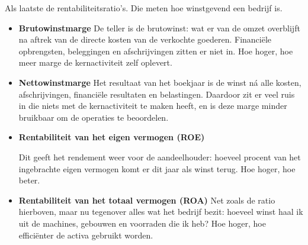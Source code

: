 \documentclass[a4paper,11pt]{article}
\begin{document}
\begin{description}
\begin{itemize}
          \end{itemize}


    \item[Rentabiliteitsratio's:]
          Als laatste de rentabiliteitsratio's. Die meten hoe winstgevend een bedrijf is.

          \begin{itemize}
              \item \textbf{Brutowinstmarge}
                    {De teller is de brutowinst: wat er van de omzet overblijft na aftrek van de directe kosten
                        van de verkochte goederen. Financiële opbrengsten, beleggingen en afschrijvingen zitten er
                        niet in. Hoe hoger, hoe meer marge de kernactiviteit zelf oplevert.}

              \item \textbf{Nettowinstmarge}
                    {Het resultaat van het boekjaar is de winst ná alle kosten, afschrijvingen, financiële
                        resultaten en belastingen. Daardoor zit er veel ruis in die niets met de kernactiviteit te
                        maken heeft, en is deze marge minder bruikbaar om de operaties te beoordelen.}

              \item \textbf{Rentabiliteit van het eigen vermogen (ROE)}

                    {Dit geeft het rendement weer voor de aandeelhouder: hoeveel procent van het ingebrachte
                        eigen vermogen komt er dit jaar als winst terug. Hoe hoger, hoe beter.}

              \item \textbf{Rentabiliteit van het totaal vermogen (ROA)}
                    {Net zoals de ratio hierboven, maar nu tegenover alles wat het bedrijf bezit:
                        hoeveel winst haal ik uit de machines, gebouwen en voorraden die ik heb?
                        Hoe hoger, hoe efficiënter de activa gebruikt worden.}


\end{itemize}
\end{description}
\end{document}
